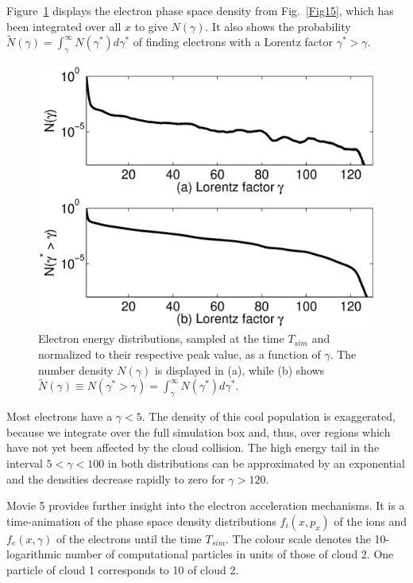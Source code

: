 \documentclass[structabstract]{aa}
\begin{document}
Figure~\ref{Fig16} displays the electron phase space density from 
Fig.~\ref{Fig15}, which has been integrated over all $x$ to give 
$N(\gamma)$. It also shows the probability $\tilde{N}(\gamma) = 
\int_\gamma^\infty N(\gamma^*) d\gamma^*$ of finding electrons with a Lorentz 
factor $\gamma^* > \gamma$.
\begin{figure}
\centering
\includegraphics[width=\columnwidth]{Fig16.eps}
\caption{Electron energy distributions, sampled at the time $T_{sim}$ and
normalized to their respective peak value, as a function of $\gamma$. The 
number density $N(\gamma)$ is displayed in (a), while (b) shows 
$\tilde{N}(\gamma) \equiv N(\gamma^* > \gamma) = \int_\gamma^\infty N(\gamma^*) 
d\gamma^*$.}\label{Fig16}
\end{figure}
Most electrons have a $\gamma < 5$. The density of this cool population is 
exaggerated, because we integrate over the full simulation box and, thus, 
over regions which have not yet been affected by the cloud collision. The 
high energy tail in the interval $5 < \gamma < 100$ in both distributions 
can be approximated by an exponential and the densities decrease rapidly to 
zero for $\gamma > 120$. 

Movie 5 provides further insight into the electron acceleration mechanisms. 
It is a time-animation of the phase space density distributions $f_i (x,p_x)$ 
of the ions and $f_e (x,\gamma)$ of the electrons until the time $T_{sim}$. 
The colour scale denotes the 10-logarithmic number of computational particles 
in units of those of cloud 2. One particle of cloud 1 corresponds to 10 of
cloud 2.
\end{document}
